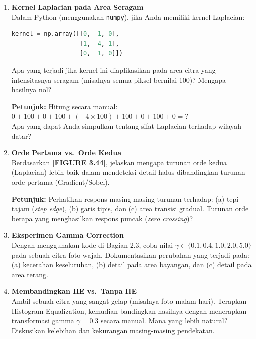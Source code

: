 \documentclass[12pt,a4paper]{article}
\begin{document}
\begin{enumerate}[leftmargin=*, label=\textbf{Latihan \arabic*.}]

  \item \textbf{Kernel Laplacian pada Area Seragam} \\
  Dalam Python (menggunakan \texttt{numpy}), jika Anda memiliki kernel Laplacian:
\begin{lstlisting}[language=Python]
kernel = np.array([[0,  1, 0],
                   [1, -4, 1],
                   [0,  1, 0]])
\end{lstlisting}
  Apa yang terjadi jika kernel ini diaplikasikan pada area citra yang intensitasnya seragam (misalnya semua piksel bernilai 100)? Mengapa hasilnya nol?

  \begin{tipbox}
  \textbf{Petunjuk:} Hitung secara manual: $0 + 100 + 0 + 100 + (-4 \times 100) + 100 + 0 + 100 + 0 = ?$ \\
  Apa yang dapat Anda simpulkan tentang sifat Laplacian terhadap wilayah datar?
  \end{tipbox}

  \item \textbf{Orde Pertama vs.\ Orde Kedua} \\
  Berdasarkan \textbf{[FIGURE 3.44]}, jelaskan mengapa turunan orde kedua (Laplacian) lebih baik dalam mendeteksi detail halus dibandingkan turunan orde pertama (Gradient/Sobel).

  \begin{tipbox}
  \textbf{Petunjuk:} Perhatikan respons masing-masing turunan terhadap: (a) tepi tajam (\textit{step edge}), (b) garis tipis, dan (c) area transisi gradual. Turunan orde berapa yang menghasilkan respons puncak (\textit{zero crossing})?
  \end{tipbox}

  \item \textbf{Eksperimen Gamma Correction} \\
  Dengan menggunakan kode di Bagian 2.3, coba nilai $\gamma \in \{0.1, 0.4, 1.0, 2.0, 5.0\}$ pada sebuah citra foto wajah. Dokumentasikan perubahan yang terjadi pada: (a) kecerahan keseluruhan, (b) detail pada area bayangan, dan (c) detail pada area terang.

  \item \textbf{Membandingkan HE vs.\ Tanpa HE} \\
  Ambil sebuah citra yang sangat gelap (misalnya foto malam hari). Terapkan Histogram Equalization, kemudian bandingkan hasilnya dengan menerapkan transformasi gamma $\gamma = 0.3$ secara manual. Mana yang lebih natural? Diskusikan kelebihan dan kekurangan masing-masing pendekatan.

\end{enumerate}
\end{document}
